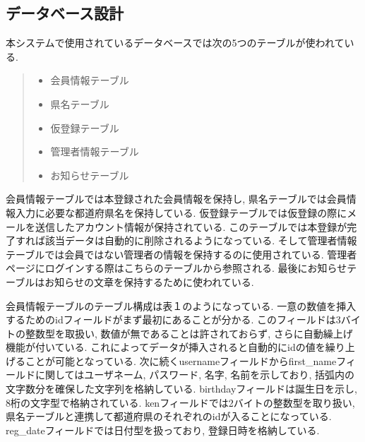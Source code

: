 \documentclass[submit,techrep]{ipsj}
\begin{document}
\subsection{データベース設計}
本システムで使用されているデータベースでは次の5つのテーブルが使われている. 
\begin{quote}
 \begin{itemize}
  \item 会員情報テーブル
  \item 県名テーブル
  \item 仮登録テーブル
  \item 管理者情報テーブル
  \item お知らせテーブル
 \end{itemize}
\end{quote}
会員情報テーブルでは本登録された会員情報を保持し, 県名テーブルでは会員情報入力に必要な都道府県名を保持している.
仮登録テーブルでは仮登録の際にメールを送信したアカウント情報が保持されている. 
このテーブルでは本登録が完了すれば該当データは自動的に削除されるようになっている. そして管理者情報テーブルでは会員ではない管理者の情報を保持するのに使用されている. 管理者ページにログインする際はこちらのテーブルから参照される.
最後にお知らせテーブルはお知らせの文章を保持するために使われている.  

会員情報テーブルのテーブル構成は表１のようになっている. 一意の数値を挿入するためのidフィールドがまず最初にあることが分かる. 
このフィールドは3バイトの整数型を取扱い, 数値が無であることは許されておらず, さらに自動繰上げ機能が付いている. これによってデータが挿入されると自動的にidの値を繰り上げることが可能となっている. 
次に続くusernameフィールドからfirst\_nameフィールドに関してはユーザネーム, パスワード, 名字, 名前を示しており, 括弧内の文字数分を確保した文字列を格納している. birthdayフィールドは誕生日を示し, 8桁の文字型で格納されている. kenフィールドでは2バイトの整数型を取り扱い, 県名テーブルと連携して都道府県のそれぞれのidが入ることになっている. 
reg\_dateフィールドでは日付型を扱っており, 登録日時を格納している. 
\begin{table}[htb]
\centering
  \caption{会員情報テーブル構成}
\end{table}
\end{document}
